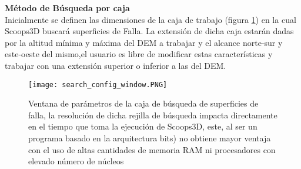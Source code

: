 \textbf{M\'{e}todo de B\'{u}squeda por caja}\\
Inicialmente se definen las dimensiones de la caja de trabajo (figura \ref{searchbox-parameters}) en la cual Scoops3D buscar\'{a}
superficies de Falla. La extensi\'{o}n de dicha caja estar\'{a}n dadas por la altitud m\'{i}nima y
m\'{a}xima del DEM a trabajar y el alcance norte-sur y este-oeste del mismo,el usuario es libre
de modificar estas caracter\'{i}sticas y trabajar con una extensi\'{o}n superior o inferior a las del
DEM.
\begin{figure}[H]
\centering
\texttt{[image: search\_config\_window.PNG]}
\caption{Ventana de par\'ametros de la caja de b\'usqueda de superficies de falla, la resoluci\'on de dicha rejilla de b\'usqueda impacta directamente en el tiempo que toma la ejecuci\'on de Scoops3D, este, al ser un programa basado en la arquitectura  bits) no obtiene mayor ventaja con el uso de altas cantidades de memoria RAM ni procesadores con elevado n\'umero de n\'ucleos}
\label{searchbox-parameters}
\end{figure}

